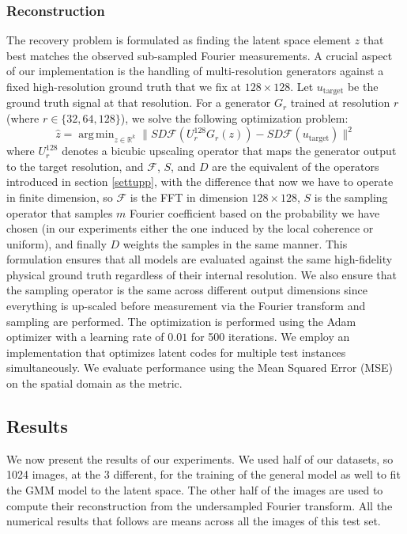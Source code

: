 \documentclass[a4paper,oneside]{amsart}
\DeclareMathOperator*{\argmin}{arg\,min}
\begin{document}
\subsubsection{Reconstruction}
The recovery problem is formulated as finding the latent space element $z$ that best matches the observed sub-sampled Fourier measurements.
A crucial aspect of our implementation is the handling of multi-resolution generators against a fixed high-resolution ground truth that we fix at $128 \times 128$. Let $u_{\text{target}}$ be the ground truth signal at that resolution. For a generator $G_r$ trained at resolution $r$ (where $r \in \{32, 64, 128\}$), we solve the following optimization problem:
\[ 
\hat{z} = \argmin_{z \in \mathbb{R}^k} \| SD \mathcal{F} ( U^{128}_r G_r ( z ) )  - SD\mathcal{F} (u_{\text{target}} ) \|^2 
\]
where $U^{128}_r$ denotes a bicubic upscaling operator that maps the generator output to the target resolution, and $\mathcal F$, $S$, and $D$ are the equivalent of the operators introduced in section \ref{settupp}, with the difference that now we have to operate in finite dimension, so $\mathcal F$ is the FFT in dimension $128\times 128$, $S$ is the sampling operator that samples $m$ Fourier coefficient based on the probability we have chosen (in our experiments either the one induced by the local coherence or uniform), and finally $D$ weights the samples in the same manner.
This formulation ensures that all models are evaluated against the same high-fidelity physical ground truth regardless of their internal resolution. We also ensure that the sampling operator is the same across different output dimensions since everything is up-scaled before measurement via the Fourier transform and sampling are performed. The optimization is performed using the Adam optimizer with a learning rate of $0.01$ for 500 iterations. We employ an implementation that optimizes latent codes for multiple test instances simultaneously. We evaluate performance using the Mean Squared Error (MSE) on the spatial domain as the metric.

\subsection{Results}
We now present the results of our experiments. We used half of our datasets, so 1024 images, at the 3 different, for the training of the general model as well to fit the GMM model to the latent space. The other half of the images are used to compute their reconstruction from the undersampled Fourier transform. All the numerical results that follows are means across all the images of this test set.
\end{document}
